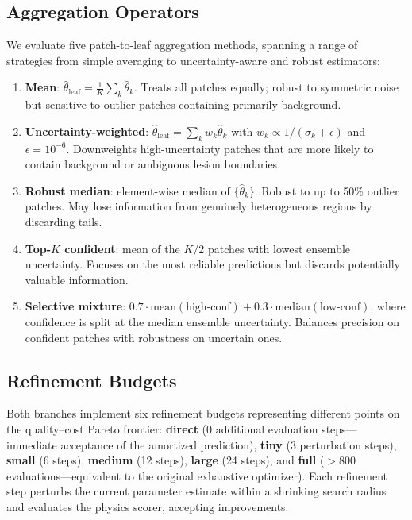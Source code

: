 \documentclass[11pt,a4paper]{article}
\newcommand{\thetahat}{\hat{\theta}}
\begin{document}
\subsection{Aggregation Operators}
\label{sec:aggregation}

We evaluate five patch-to-leaf aggregation methods, spanning a range of strategies from simple averaging to uncertainty-aware and robust estimators:

\begin{enumerate}[nosep]
    \item \textbf{Mean}: $\thetahat_\mathrm{leaf} = \frac{1}{K}\sum_k \thetahat_k$. Treats all patches equally; robust to symmetric noise but sensitive to outlier patches containing primarily background.
    \item \textbf{Uncertainty-weighted}: $\thetahat_\mathrm{leaf} = \sum_k w_k \thetahat_k$ with $w_k \propto 1/(\sigma_k + \epsilon)$ and $\epsilon = 10^{-6}$. Downweights high-uncertainty patches that are more likely to contain background or ambiguous lesion boundaries.
    \item \textbf{Robust median}: element-wise median of $\{\thetahat_k\}$. Robust to up to 50\% outlier patches. May lose information from genuinely heterogeneous regions by discarding tails.
    \item \textbf{Top-$K$ confident}: mean of the $K/2$ patches with lowest ensemble uncertainty. Focuses on the most reliable predictions but discards potentially valuable information.
    \item \textbf{Selective mixture}: $0.7 \cdot \mathrm{mean}(\text{high-conf}) + 0.3 \cdot \mathrm{median}(\text{low-conf})$, where confidence is split at the median ensemble uncertainty. Balances precision on confident patches with robustness on uncertain ones.
\end{enumerate}

\subsection{Refinement Budgets}

Both branches implement six refinement budgets representing different points on the quality--cost Pareto frontier:
\textbf{direct} (0 additional evaluation steps---immediate acceptance of the amortized prediction),
\textbf{tiny} (3 perturbation steps),
\textbf{small} (6 steps),
\textbf{medium} (12 steps),
\textbf{large} (24 steps), and
\textbf{full} ($>$800 evaluations---equivalent to the original exhaustive optimizer).
Each refinement step perturbs the current parameter estimate within a shrinking search radius and evaluates the physics scorer, accepting improvements.
\end{document}
